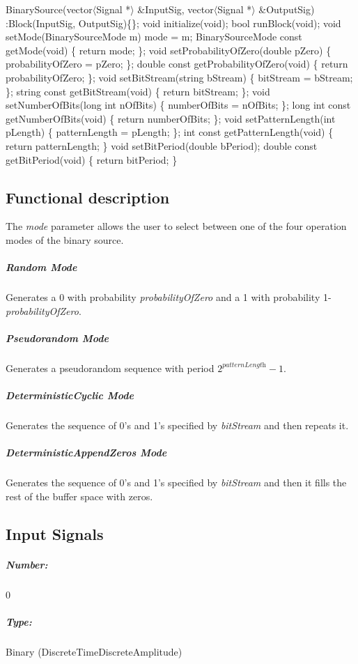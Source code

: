 \documentclass[a4paper]{article}
\begin{document}
BinarySource(vector$\langle$Signal *$\rangle$ \&InputSig, vector$\langle$Signal *$\rangle$ \&OutputSig) :Block(InputSig, OutputSig)\{\};
\bigbreak	 
void initialize(void);
\bigbreak	 
bool runBlock(void);
\bigbreak	 
void setMode(BinarySourceMode m) {mode = m;}
BinarySourceMode const getMode(void) \{ return mode; \};
\bigbreak	 
void setProbabilityOfZero(double pZero) \{ probabilityOfZero = pZero; \};
\bigbreak
double const getProbabilityOfZero(void) \{ return probabilityOfZero; \};
\bigbreak	 
void setBitStream(string bStream) \{ bitStream = bStream; \};
\bigbreak
string const getBitStream(void) \{ return bitStream; \};
\bigbreak	 
void setNumberOfBits(long int nOfBits) \{ numberOfBits = nOfBits; \};
\bigbreak
long int const getNumberOfBits(void) \{ return numberOfBits; \};
\bigbreak	 
void setPatternLength(int pLength) \{ patternLength = pLength; \};
\bigbreak
int const getPatternLength(void) \{ return patternLength; \}
\bigbreak	 
void setBitPeriod(double bPeriod);
\bigbreak
double const getBitPeriod(void) \{ return bitPeriod; \}

\subsection*{Functional description}

The \textit{mode} parameter allows the user to select between one of the four operation modes of the binary source.

\subparagraph*{Random Mode}
Generates a 0 with probability \textit{probabilityOfZero} and a 1 with probability 1-\textit{probabilityOfZero}.

\subparagraph*{Pseudorandom Mode} 
Generates a pseudorandom sequence with period $2^\textit{patternLength}-1$.

\subparagraph*{DeterministicCyclic Mode}
Generates the sequence of 0's and 1's specified by \textit{bitStream} and then repeats it.

\subparagraph*{DeterministicAppendZeros Mode}
Generates the sequence of 0's and 1's specified by \textit{bitStream} and then it fills the rest of the buffer space with zeros.

\subsection*{Input Signals}


\subparagraph*{Number:} 0

\subparagraph*{Type:} Binary (DiscreteTimeDiscreteAmplitude)
\end{document}
